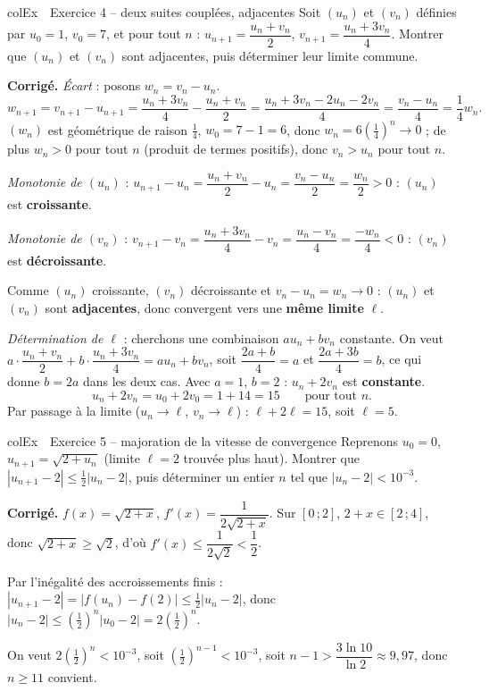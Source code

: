 \documentclass[11pt,a4paper]{article}
\newenvironment{exemple}[1][Exemple]
  {\begin{fiche}{colEx}{\ding{217}~~#1}}{\end{fiche}}
\begin{document}
\begin{exemple}[Exercice 4 -- deux suites couplées, adjacentes]
Soit $(u_n)$ et $(v_n)$ définies par $u_0=1$, $v_0=7$, et pour tout $n$ : $u_{n+1} = \dfrac{u_n+v_n}{2}$, $v_{n+1} = \dfrac{u_n+3v_n}{4}$. Montrer que $(u_n)$ et $(v_n)$ sont adjacentes, puis déterminer leur limite commune.

\smallskip
\textbf{Corrigé.} \emph{Écart} : posons $w_n=v_n-u_n$.
\[
  w_{n+1} = v_{n+1} - u_{n+1} = \frac{u_n+3v_n}{4} - \frac{u_n+v_n}{2} = \frac{u_n+3v_n - 2u_n - 2v_n}{4} = \frac{v_n - u_n}{4} = \frac14w_n.
\]
$(w_n)$ est géométrique de raison $\frac14$, $w_0=7-1=6$, donc $w_n=6\left(\frac14\right)^n\to0$ ; de plus $w_n>0$ pour tout $n$ (produit de termes positifs), donc $v_n>u_n$ pour tout $n$.

\smallskip
\emph{Monotonie de $(u_n)$} : $u_{n+1}-u_n=\dfrac{u_n+v_n}{2}-u_n=\dfrac{v_n-u_n}{2}=\dfrac{w_n}{2}>0$ : $(u_n)$ est \textbf{croissante}.

\smallskip
\emph{Monotonie de $(v_n)$} : $v_{n+1}-v_n=\dfrac{u_n+3v_n}{4}-v_n=\dfrac{u_n-v_n}{4}=\dfrac{-w_n}{4}<0$ : $(v_n)$ est \textbf{décroissante}.

\smallskip
Comme $(u_n)$ croissante, $(v_n)$ décroissante et $v_n-u_n=w_n\to0$ : $(u_n)$ et $(v_n)$ sont \textbf{adjacentes}, donc convergent vers une \textbf{même limite} $\ell$.

\smallskip
\emph{Détermination de $\ell$} : cherchons une combinaison $au_n+bv_n$ constante. On veut $a\cdot\dfrac{u_n+v_n}{2}+b\cdot\dfrac{u_n+3v_n}{4}=au_n+bv_n$, soit $\dfrac{2a+b}{4}=a$ et $\dfrac{2a+3b}{4}=b$, ce qui donne $b=2a$ dans les deux cas. Avec $a=1$, $b=2$ : $u_n+2v_n$ est \textbf{constante}.
\[
  u_n+2v_n = u_0+2v_0 = 1+14 = 15 \qquad \text{pour tout } n.
\]
Par passage à la limite ($u_n\to\ell$, $v_n\to\ell$) : $\ell+2\ell=15$, soit $\boxed{\ell=5}$.
\end{exemple}

\begin{exemple}[Exercice 5 -- majoration de la vitesse de convergence]
Reprenons $u_0=0$, $u_{n+1}=\sqrt{2+u_n}$ (limite $\ell=2$ trouvée plus haut). Montrer que $|u_{n+1}-2| \leq \frac{1}{2}|u_n - 2|$, puis déterminer un entier $n$ tel que $|u_n - 2| < 10^{-3}$.

\smallskip
\textbf{Corrigé.} $f(x) = \sqrt{2+x}$, $f'(x) = \dfrac{1}{2\sqrt{2+x}}$. Sur $[0\,;2]$, $2+x \in [2\,;4]$, donc $\sqrt{2+x} \geq \sqrt{2}$, d'où $f'(x) \leq \dfrac{1}{2\sqrt{2}} < \dfrac{1}{2}$.

\smallskip
Par l'inégalité des accroissements finis : $|u_{n+1}-2| = |f(u_n)-f(2)| \leq \frac{1}{2}|u_n-2|$, donc $|u_n - 2| \leq \left(\frac{1}{2}\right)^n |u_0-2| = 2\left(\frac{1}{2}\right)^n$.

\smallskip
On veut $2\left(\frac{1}{2}\right)^n < 10^{-3}$, soit $\left(\frac{1}{2}\right)^{n-1} < 10^{-3}$, soit $n - 1 > \dfrac{3\ln 10}{\ln 2} \approx 9{,}97$, donc $n \geq 11$ convient.
\end{exemple}
\end{document}
